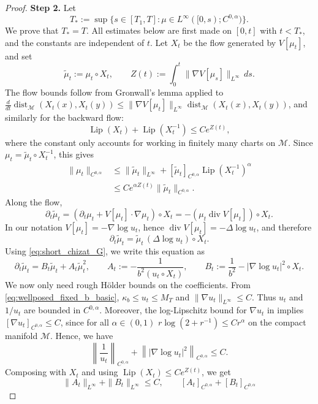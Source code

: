 \documentclass[11pt]{article}
\theoremstyle{definition}
\newcommand{\divg}{\operatorname{div}}
\def\M{\mathcal M}
\begin{document}
\begin{proof}
\smallskip
\noindent\textbf{Step 2.}
Let
\[
T_\ast:=\sup\{s\in[T_1,T]:
\mu\in L^\infty([0,s);C^{0,\alpha})\}.
\]
We prove that \(T_\ast=T\).  All estimates below are first made on
\([0,t]\) with \(t<T_\ast\), and the constants are independent of \(t\).  Let
\(X_t\) be the flow generated by \(V[\mu_t]\), and set
\[
\tilde\mu_t:=\mu_t\circ X_t,\qquad
Z(t):=\int_0^t\|\nabla V[\mu_s]\|_{L^\infty}\,ds .
\]
The flow bounds follow from Gronwall's lemma applied to
\(\frac{d}{dt}\operatorname{dist}_{ \M}(X_t(x),X_t(y))\le
\|\nabla V[\mu_t]\|_{L^\infty}\operatorname{dist}_{ \M}(X_t(x),X_t(y))\), and similarly for the
backward flow:
\[
\operatorname{Lip}(X_t)+\operatorname{Lip}(X_t^{-1})\le C e^{Z(t)},
\]
where the constant only accounts for working in finitely many charts on
 \(\M\). Since \(\mu_t=\tilde\mu_t\circ X_t^{-1}\), this gives
\[
\begin{aligned}
\|\mu_t\|_{C^{0,\alpha}}
&\le \|\tilde\mu_t\|_{L^\infty}
+[\tilde\mu_t]_{C^{0,\alpha}}\operatorname{Lip}(X_t^{-1})^\alpha  \\
&\le C e^{\alpha Z(t)}\|\tilde\mu_t\|_{C^{0,\alpha}} .
\end{aligned}
\]
Along the flow,
\[
\partial_t\tilde\mu_t
=\left(\partial_t\mu_t+V[\mu_t]\cdot\nabla\mu_t\right)\circ X_t
=-\left(\mu_t\divg V[\mu_t]\right)\circ X_t .
\] 
In our
notation \(V[\mu_t]=-\nabla\log u_t\), hence
\(\divg V[\mu_t]=-\Delta\log u_t\), and therefore
\[
\partial_t\tilde\mu_t=\tilde\mu_t\,(\Delta\log u_t)\circ X_t .
\]
Using \eqref{eq:short_chizat_G}, we write this equation as
\begin{equation}
\label{eq:wp_A_B}
\partial_t\tilde\mu_t
=B_t\tilde\mu_t+A_t\tilde\mu_t^2,
\qquad
A_t:=-\frac1{b^2(u_t\circ X_t)},\qquad
B_t:=\frac1{b^2}-|\nabla\log u_t|^2\circ X_t .
\end{equation}
We now only need rough Hölder bounds on the coefficients.  From
\eqref{eq:wellposed_fixed_b_basic}, \(\kappa_b\le u_t\le M_T\) and
\(\|\nabla u_t\|_{L^\infty}\le C\).  Thus \(u_t\) and \(1/u_t\) are bounded in
\(C^{0,\alpha}\).  Moreover, the log-Lipschitz bound for \(\nabla u_t\) in
 implies
\([\nabla u_t]_{C^{0,\alpha}}\le C\), since for all $\alpha \in (0,1)$
\(r\log(2+r^{-1})\le Cr^\alpha\) on the compact manifold
 \(\M\).  Hence, we have
\[
\left\|\frac1{u_t}\right\|_{C^{0,\alpha}}
+\left\||\nabla\log u_t|^2\right\|_{C^{0,\alpha}}
\le C .
\]
Composing with \(X_t\) and using \(\operatorname{Lip}(X_t)\le Ce^{Z(t)}\), we get
\[
\|A_t\|_{L^\infty}+\|B_t\|_{L^\infty}\le C,
\qquad
[A_t]_{C^{0,\alpha}}+[B_t]_{C^{0,\alpha}}
\]
\end{proof}
\end{document}
